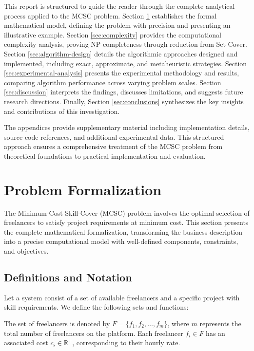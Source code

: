 \documentclass[12pt,a4paper]{article}
\begin{document}
This report is structured to guide the reader through the complete analytical process applied to the MCSC problem. Section \ref{sec:formalization} establishes the formal mathematical model, defining the problem with precision and presenting an illustrative example. Section \ref{sec:complexity} provides the computational complexity analysis, proving NP-completeness through reduction from Set Cover. Section \ref{sec:algorithm-design} details the algorithmic approaches designed and implemented, including exact, approximate, and metaheuristic strategies. Section \ref{sec:experimental-analysis} presents the experimental methodology and results, comparing algorithm performance across varying problem scales. Section \ref{sec:discussion} interprets the findings, discusses limitations, and suggests future research directions. Finally, Section \ref{sec:conclusions} synthesizes the key insights and contributions of this investigation.

The appendices provide supplementary material including implementation details, source code references, and additional experimental data. This structured approach ensures a comprehensive treatment of the MCSC problem from theoretical foundations to practical implementation and evaluation.
	
\section{Problem Formalization}
\label{sec:formalization}

The Minimum-Cost Skill-Cover (MCSC) problem involves the optimal selection of freelancers to satisfy project requirements at minimum cost. This section presents the complete mathematical formalization, transforming the business description into a precise computational model with well-defined components, constraints, and objectives.

\subsection{Definitions and Notation}
\label{subsec:definitions}

Let a system consist of a set of available freelancers and a specific project with skill requirements. We define the following sets and functions:

The set of freelancers is denoted by $F = \{f_1, f_2, \ldots, f_m\}$, where $m$ represents the total number of freelancers on the platform. Each freelancer $f_i \in F$ has an associated cost $c_i \in \mathbb{R}^+$, corresponding to their hourly rate.
\end{document}
